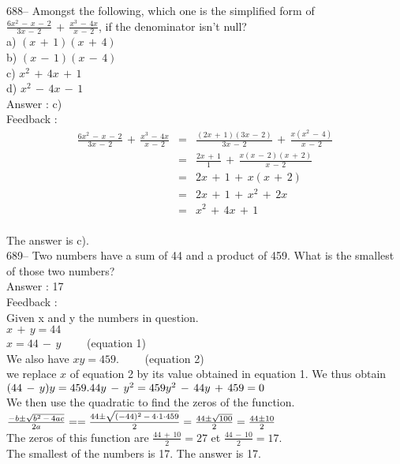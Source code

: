 \documentclass[letterpaper, 12pt]{article}
\begin{document}
688-- Amongst the following, which one is the simplified form of
$\frac{6x^{2}\,-\,x\,-\,2}{3x\,-\,2}\,+\,\frac{x^{3}\,-\,4x}{x\,-\,2}$, if the denominator isn't null?\\
a) $(x\,+\,1)(x\,+\,4)$\\
b) $(x\,-\,1)(x\,-\,4)$\\
c) $x^{2}\,+\,4x\,+\,1$\\
d) $x^{2}\,-\,4x\,-\,1$\\

Answer : c)\\

Feedback : \\
\begin{eqnarray*}
\frac{6x^{2}\,-\,x\,-\,2}{3x\,-\,2}\,+\,\frac{x^{3}\,-\,4x}{x\,-\,2}&=&\frac{(2x\,+\,1)(3x\,-\,2)}{3x\,-\,2}\,+\,\frac{x(x^{2}\,-\,4)}{x\,-\,2}\\[2mm]
&=&\frac{2x\,+\,1}{1}\,+\,\frac{x(x\,-\,2)(x\,+\,2)}{x\,-\,2}\\[2mm]
&=&2x\,+\,1\,+\,x(x\,+\,2)\\[2mm]
&=&2x\,+\,1\,+\,x^{2}\,+\,2x\\[2mm]
&=&x^{2}\,+\,4x\,+\,1\\
\end{eqnarray*}

The answer is c).\\

689-- Two numbers have a sum of 44 and a product of 459. What is the smallest of those two numbers?\\

Answer : 17\\

Feedback : \\
Given x and y the numbers in question.\\
$x\,+\,y=44$\\
$x=44\,-\,y \qquad$ (equation 1)\\
We also have $xy=459. \qquad$ (equation 2)\\
we replace $x$ of equation 2 by its value obtained in equation 1.
We thus obtain $(44\,-\,y)y=459.\\
44y\,-\,y^{2}=459\\
y^{2}\,-\,44y\,+\,459=0$\\

We then use the quadratic to find the zeros of the function.\\[2mm]
$\frac{-b\pm \sqrt{b^{2}\,-\,4ac}}{2a}=\\[2mm]
=\frac{44\pm\sqrt{(-44)^{2}\,-\,4\cdot1\cdot459}}{2}\\[2mm]
=\frac{44\pm \sqrt{100}}{2}\\[2mm]
=\frac{44\pm 10}{2}$\\[2mm]
The zeros of this function are $\frac{44\,+\,10}{2}=27$ et
$\frac{44\,-\,10}{2}=17$.\\[2mm]
The smallest of the numbers is 17.  The answer is 17.\\
\end{document}
